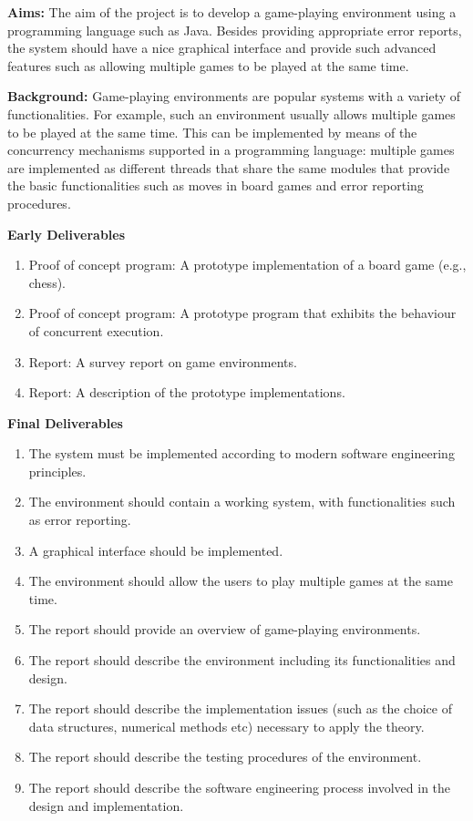 \documentclass[]{interim}
\begin{document}
\textbf{Aims:} The aim of the project is to develop a game-playing environment
using a programming language such as Java. Besides providing appropriate error reports,
the system should have a nice graphical interface and provide such advanced
features such as allowing multiple games to be played at the same time.

\textbf{Background:} Game-playing environments are popular systems with a
variety of functionalities. For example, such an environment usually allows
multiple games to be played at the same time. This can be implemented by means
of the concurrency mechanisms supported in a programming language: multiple games
are implemented as different threads that share the same modules that provide
the basic functionalities such as moves in board games and error reporting procedures.

\textbf{Early Deliverables}
\begin{enumerate}
  \item Proof of concept program: A prototype implementation of a board game (e.g., chess).
  \item Proof of concept program: A prototype program that exhibits the behaviour of concurrent execution.
  \item Report: A survey report on game environments.
  \item Report: A description of the prototype implementations.
\end{enumerate}

\textbf{Final Deliverables}
\begin{enumerate}
  \item The system must be implemented according to modern software engineering principles.
  \item The environment should contain a working system, with functionalities such as error reporting.
  \item A graphical interface should be implemented.
  \item The environment should allow the users to play multiple games at the same time.
  \item The report should provide an overview of game-playing environments.
  \item The report should describe the environment including its functionalities and design.
  \item The report should describe the implementation issues (such as the choice of data structures, numerical methods etc) necessary to apply the theory.
  \item The report should describe the testing procedures of the environment.
  \item The report should describe the software engineering process involved in the design and implementation.
\end{enumerate}
\end{document}
